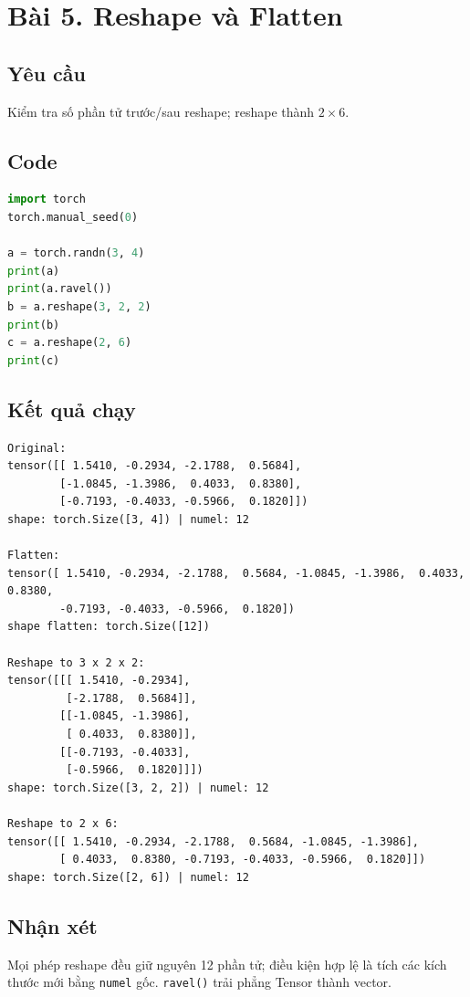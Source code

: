 \documentclass[a4paper,13pt]{article}
\begin{document}
\newpage
\section{Bài 5. Reshape và Flatten}

\subsection{Yêu cầu}
Kiểm tra số phần tử trước/sau reshape; reshape thành $2 \times 6$.

\subsection{Code}
\begin{lstlisting}[language=Python]
import torch
torch.manual_seed(0)

a = torch.randn(3, 4)
print(a)
print(a.ravel())
b = a.reshape(3, 2, 2)
print(b)
c = a.reshape(2, 6)
print(c)
\end{lstlisting}

\subsection{Kết quả chạy}
\begin{lstlisting}[backgroundcolor=\color{outgray}]
Original:
tensor([[ 1.5410, -0.2934, -2.1788,  0.5684],
        [-1.0845, -1.3986,  0.4033,  0.8380],
        [-0.7193, -0.4033, -0.5966,  0.1820]])
shape: torch.Size([3, 4]) | numel: 12

Flatten:
tensor([ 1.5410, -0.2934, -2.1788,  0.5684, -1.0845, -1.3986,  0.4033,  0.8380,
        -0.7193, -0.4033, -0.5966,  0.1820])
shape flatten: torch.Size([12])

Reshape to 3 x 2 x 2:
tensor([[[ 1.5410, -0.2934],
         [-2.1788,  0.5684]],
        [[-1.0845, -1.3986],
         [ 0.4033,  0.8380]],
        [[-0.7193, -0.4033],
         [-0.5966,  0.1820]]])
shape: torch.Size([3, 2, 2]) | numel: 12

Reshape to 2 x 6:
tensor([[ 1.5410, -0.2934, -2.1788,  0.5684, -1.0845, -1.3986],
        [ 0.4033,  0.8380, -0.7193, -0.4033, -0.5966,  0.1820]])
shape: torch.Size([2, 6]) | numel: 12
\end{lstlisting}

\subsection{Nhận xét}
Mọi phép reshape đều giữ nguyên 12 phần tử; điều kiện hợp lệ là tích các kích thước mới bằng \texttt{numel} gốc. \texttt{ravel()} trải phẳng Tensor thành vector.
\end{document}

